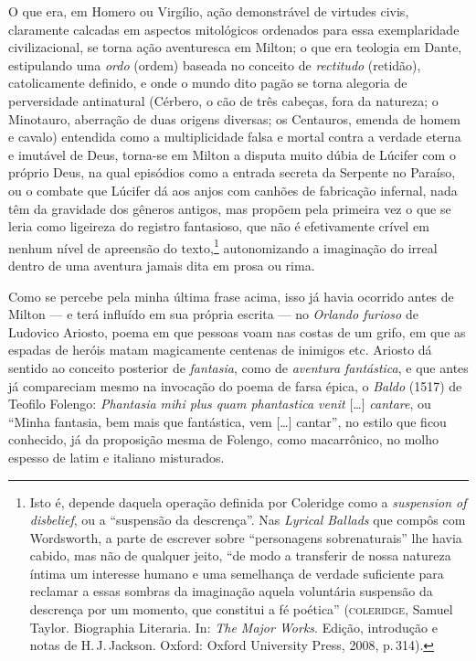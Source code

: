 O que era, em Homero ou Virgílio, ação demonstrável de virtudes civis,
claramente calcadas em aspectos mitológicos ordenados para essa
exemplaridade civilizacional, se torna ação aventuresca em Milton; o que
era teologia em Dante, estipulando uma \emph{ordo} (ordem) baseada no
conceito de \emph{rectitudo} (retidão), catolicamente definido, e onde o
mundo dito pagão se torna alegoria de perversidade antinatural (Cérbero,
o cão de três cabeças, fora da natureza; o Minotauro, aberração de duas
origens diversas; os Centauros, emenda de homem e cavalo) entendida como
a multiplicidade falsa e mortal contra a verdade eterna e imutável de
Deus, torna-se em Milton a disputa muito dúbia de Lúcifer com o próprio
Deus, na qual episódios como a entrada secreta da Serpente no Paraíso,
ou o combate que Lúcifer dá aos anjos com canhões de fabricação
infernal, nada têm da gravidade dos gêneros antigos, mas propõem pela
primeira vez o que se leria como ligeireza do registro fantasioso, que
não é efetivamente crível em nenhum nível de apreensão do
texto,\footnote{Isto é, depende daquela operação definida por Coleridge
  como a \emph{suspension of disbelief}, ou a ``suspensão da
  descrença''. Nas \emph{Lyrical Ballads} que compôs com Wordsworth, a
  parte de escrever sobre ``personagens sobrenaturais'' lhe havia
  cabido, mas não de qualquer jeito, ``de modo a transferir de nossa
  natureza íntima um interesse humano e uma semelhança de verdade
  suficiente para reclamar a essas sombras da imaginação aquela
  voluntária suspensão da descrença por um momento, que constitui a fé
  poética'' (\textsc{coleridge}, Samuel Taylor. Biographia Literaria. In:
  \emph{The Major Works}. Edição, introdução e notas de H.\,J.\,Jackson. Oxford: Oxford University
  Press, 2008, p.\,314).} autonomizando a imaginação do irreal dentro de
uma aventura jamais dita em prosa ou rima.

Como se percebe pela minha última frase acima, isso já havia ocorrido
antes de Milton --- e terá influído em sua própria escrita --- no
\emph{Orlando furioso} de Ludovico Ariosto, poema em que
pessoas voam nas costas de um grifo, em que as espadas de heróis matam
magicamente centenas de inimigos etc. Ariosto dá sentido ao conceito
posterior de \emph{fantasia}, como de \emph{aventura fantástica}, e que
antes já compareciam mesmo na invocação do poema de farsa épica, o
\emph{Baldo} (1517) de Teofilo Folengo: \emph{Phantasia mihi
plus quam phantastica venit} [\ldots{}] \emph{cantare}, ou ``Minha fantasia, bem
mais que fantástica, vem [\ldots{}] cantar'', no estilo que ficou conhecido,
já da proposição mesma de Folengo, como macarrônico, no molho
espesso de latim e italiano misturados.

